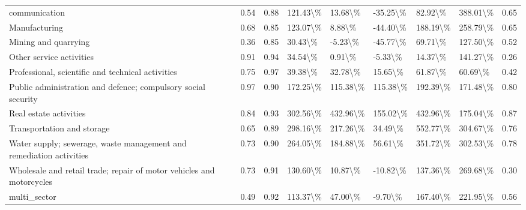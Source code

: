 \begin{table}
{\begin{tabular}[t]{lllllllll}
communication & 0.54 & 0.88 & 121.43\textbackslash{}\% & 13.68\textbackslash{}\% & -35.25\textbackslash{}\% & 82.92\textbackslash{}\% & 388.01\textbackslash{}\% & 0.65\\
\addlinespace
Manufacturing & 0.68 & 0.85 & 123.07\textbackslash{}\% & 8.88\textbackslash{}\% & -44.40\textbackslash{}\% & 188.19\textbackslash{}\% & 258.79\textbackslash{}\% & 0.65\\
Mining and quarrying & 0.36 & 0.85 & 30.43\textbackslash{}\% & -5.23\textbackslash{}\% & -45.77\textbackslash{}\% & 69.71\textbackslash{}\% & 127.50\textbackslash{}\% & 0.52\\
Other service activities & 0.91 & 0.94 & 34.54\textbackslash{}\% & 0.91\textbackslash{}\% & -5.33\textbackslash{}\% & 14.37\textbackslash{}\% & 141.27\textbackslash{}\% & 0.26\\
Professional, scientific
and technical activities & 0.75 & 0.97 & 39.38\textbackslash{}\% & 32.78\textbackslash{}\% & 15.65\textbackslash{}\% & 61.87\textbackslash{}\% & 60.69\textbackslash{}\% & 0.42\\
Public administration
and defence; compulsory
social security & 0.97 & 0.90 & 172.25\textbackslash{}\% & 115.38\textbackslash{}\% & 115.38\textbackslash{}\% & 192.39\textbackslash{}\% & 171.48\textbackslash{}\% & 0.80\\
\addlinespace
Real estate activities & 0.84 & 0.93 & 302.56\textbackslash{}\% & 432.96\textbackslash{}\% & 155.02\textbackslash{}\% & 432.96\textbackslash{}\% & 175.04\textbackslash{}\% & 0.87\\
Transportation and
storage & 0.65 & 0.89 & 298.16\textbackslash{}\% & 217.26\textbackslash{}\% & 34.49\textbackslash{}\% & 552.77\textbackslash{}\% & 304.67\textbackslash{}\% & 0.76\\
Water supply; sewerage,
waste management and
remediation activities & 0.73 & 0.90 & 264.05\textbackslash{}\% & 184.88\textbackslash{}\% & 56.61\textbackslash{}\% & 351.72\textbackslash{}\% & 302.53\textbackslash{}\% & 0.78\\
Wholesale and retail
trade; repair of motor
vehicles and motorcycles & 0.73 & 0.91 & 130.60\textbackslash{}\% & 10.87\textbackslash{}\% & -10.82\textbackslash{}\% & 137.36\textbackslash{}\% & 269.68\textbackslash{}\% & 0.30\\
multi\_sector & 0.49 & 0.92 & 113.37\textbackslash{}\% & 47.00\textbackslash{}\% & -9.70\textbackslash{}\% & 167.40\textbackslash{}\% & 221.95\textbackslash{}\% & 0.56\\
\bottomrule
\end{tabular}}
\end{table}
